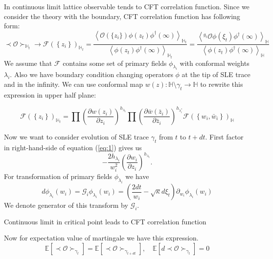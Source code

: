 In continuous limit lattice observable tends to CFT correlation function. Since we consider the theory with the boundary, CFT correlation function has following form:
\begin{equation*}
  \prec \mathcal{O} \succ_{\mathbb{H}_{t}}\to \mathcal{F}(\left\{z_{i}\right\})_{\mathbb{H}_{t}}=
  \frac{\left< \mathcal{O}(\{z_{i}\})\phi(z_{t})\phi^{\dagger}(\infty)\right>_{\mathbb{H}_{t}}}{\left<\phi(z_{t})\phi^{\dagger}(\infty)\right>_{\mathbb{H}_{t}}}=
  \frac{\left< ^{g_{t}}\mathcal{O}\phi(\xi_{t})\phi^{\dagger}(\infty)\right>_{\mathbb{H}}}{\left<\phi(z_{t})\phi^{\dagger}(\infty)\right>_{\mathbb{H}}}
\end{equation*}
We assume that $\mathcal{F}$ contains some set of primary fields $\phi_{\lambda_{i}}$ with conformal weights $\lambda_{i}$. Also we have boundary condition changing operators  $\phi$ at the tip of SLE trace and in the infinity.  We can use conformal map  $w(z):\mathbb{H}\setminus\gamma_{t}\to \mathbb{H}$ to rewrite this expression in upper half plane:

\begin{equation}
  \mathcal{F}(\left\{z_{i}\right\})_{\mathbb{H}_{t}}=\prod \left(\frac{\partial w(z_{i})}{\partial z_{i}}\right)^{h_{\lambda_i}} 
  \prod \left(\frac{\partial \bar w(\bar z_{i})}{\partial \bar z_{i}}\right)^{h_{\lambda^{*}_i}}
  \mathcal{F}(\left\{w_{i}, \bar w_{i}\right\})_{\mathbb{H}}
  \label{eq:1}
\end{equation}

Now we want to consider evolution of SLE trace $\gamma_{t}$ from  $t$ to $t+ dt$. First factor in right-hand-side of equation (\ref{eq:1}) gives us
\begin{equation*}
  -\frac{2h_{\lambda_{i}}}{w_{i}^{2}}\left(\frac{\partial w_{i}}{\partial z_{i}}\right)^{h_{\lambda_{i}}}.
\end{equation*}
For transformation of primary fields $\phi_{\lambda_{i}}$ we have 
\begin{equation}
  \label{eq:2}
  d\phi_{\lambda_{i}}(w_{i}) = \mathcal{G}_{i}\phi_{\lambda_{i}}(w_{i})=\left(\frac{2dt}{w_{i}}-\sqrt{\kappa} d\xi_{t}\right) \partial_{w_{i}}\phi_{\lambda_{i}}(w_{i}) 
\end{equation}
We denote generator of this transform by $\mathcal{G}_{i}$.



Continuous limit in critical point leads to CFT correlation function

Now for expectation value of martingale we have this expression.
\begin{equation*}
  \mathbb{E}\left[\prec\mathcal{O}\succ_{\gamma_{t}}\right]=    \mathbb{E}\left[\prec\mathcal{O}\succ_{\gamma_{t+dt}}\right], \quad \mathbb{E}\left[d \prec\mathcal{O}\succ_{\gamma_{t}}\right]=0
\end{equation*}

